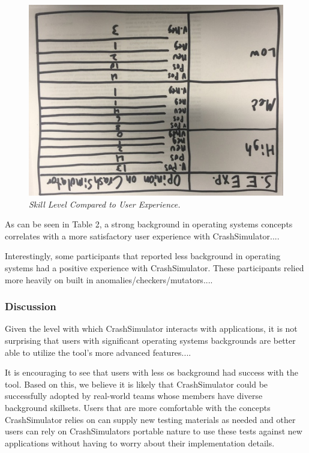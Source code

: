 \begin{figure}[t]
  \center{}
  \includegraphics[scale=.5]{images/table2}
  \caption{\emph{Skill Level Compared to User Experience.}}
  \label{fig-skill-exp}
\end{figure}

As can be seen in Table 2, a strong background in operating systems
concepts correlates with a more satisfactory user experience with
CrashSimulator....

Interestingly,  some participants that reported less background in
operating systems had a positive experience with CrashSimulator.  These
participants relied more heavily on built in
anomalies/checkers/mutators....


\subsubsection{Discussion}

Given the level with which CrashSimulator interacts with applications, it
is not surprising that users with significant operating systems backgrounds
are better able to utilize the tool's more advanced features....

It is encouraging to see that users with less os background had success
with the tool.  Based on this, we believe it is likely that CrashSimulator
could be successfully adopted by real-world teams whose members have
diverse background skillsets.  Users that are more comfortable with the
concepts CrashSimulator relies on can supply new testing materials as
needed and other users can rely on CrashSimulators portable nature to use
these tests against new applications without having to worry about their
implementation details.


